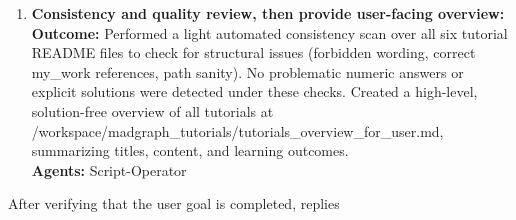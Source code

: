 \documentclass[submission, Phys]{SciPost}
\begin{document}
\begin{planblock}[Plan]
\begin{enumerate}[leftmargin=*, label=\textbf{Step \arabic*:}, itemsep=0.6em]
\item \textbf{Consistency and quality review, then provide user-facing overview:}\\ 
\textbf{Outcome:} Performed a light automated consistency scan over all six tutorial README files to check for structural issues (forbidden wording, correct my\_work references, path sanity). No problematic numeric answers or explicit solutions were detected under these checks. Created a high-level, solution-free overview of all tutorials at /workspace/madgraph\_tutorials/tutorials\_overview\_for\_user.md, summarizing titles, content, and learning outcomes.\\
\textbf{Agents:} Script-Operator
\end{enumerate}
\end{planblock}
%
After verifying that the user goal is completed, \ma replies
%
\end{document}
